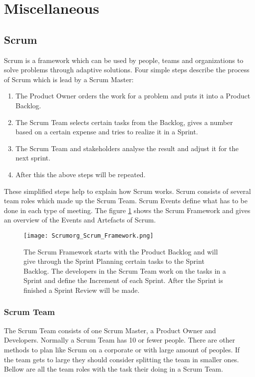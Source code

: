 \section{Miscellaneous}

\subsection{Scrum} \label{sec:Scrum}
Scrum is a framework which can be used by people, teams and organizations to solve problems through adaptive solutions. Four simple steps describe the process of Scrum which is lead by a Scrum Master:
\begin{enumerate}
    \item The Product Owner orders the work for a problem and puts it into a Product Backlog.
    \item The Scrum Team selects certain tasks from the Backlog, gives a number based on a certain expense and tries to realize it in a Sprint.
    \item The Scrum Team and stakeholders analyse the result and adjust it for the next sprint.
    \item After this the above steps will be repeated.
\end{enumerate}

These simplified steps help to explain how Scrum works. Scrum consists of several team roles which made up the Scrum Team. Scrum Events define what has to be done in each type of meeting. The figure \ref{fig:Scrum Framework} shows the Scrum Framework and gives an overview of the Events and Artefacts of Scrum. \cite{scrum_guide}


\begin{figure}[H]
    \centering
    \texttt{[image: Scrumorg\_Scrum\_Framework.png]}
    \caption{The Scrum Framework starts with the Product Backlog and will give through the Sprint Planning certain tasks to the Sprint Backlog. The developers in the Scrum Team work on the tasks in a Sprint and define the Increment of each Sprint. After the Sprint is finished a Sprint Review will be made. \cite{scrum_guide}}
    \label{fig:Scrum Framework}
\end{figure}


\subsubsection{Scrum Team} \label{sec:Scrum Team}
The Scrum Team consists of one Scrum Master, a Product Owner and Developers. Normally a Scrum Team has 10 or fewer people. There are other methods to plan like Scrum on a corporate or with large amount of peoples. If the team gets to large they should consider splitting the team in smaller ones. Bellow are all the team roles with the task their doing in a Scrum Team. \cite{scrum_guide}

